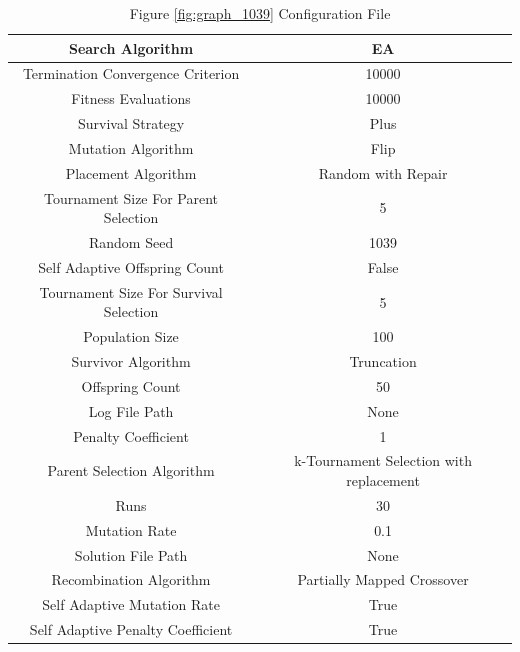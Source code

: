 \documentclass{standalone}
\begin{document}
\begin{table}[!htb]
	\centering
	\caption{Figure \ref{fig:graph_1039} Configuration File}
	\label{tab:graph_1039}
	\begin{tabular}{| c | c |}
		\hline
		Search Algorithm		& EA		 \\
		\hline
		Termination Convergence Criterion		& 10000		 \\
		\hline
		Fitness Evaluations		& 10000		 \\
		\hline
		Survival Strategy		& Plus		 \\
		\hline
		Mutation Algorithm		& Flip		 \\
		\hline
		Placement Algorithm		& Random with Repair		 \\
		\hline
		Tournament Size For Parent Selection		& 5		 \\
		\hline
		Random Seed		& 1039		 \\
		\hline
		Self Adaptive Offspring Count		& False		 \\
		\hline
		Tournament Size For Survival Selection		& 5		 \\
		\hline
		Population Size		& 100		 \\
		\hline
		Survivor Algorithm		& Truncation		 \\
		\hline
		Offspring Count		& 50		 \\
		\hline
		Log File Path		& None		 \\
		\hline
		Penalty Coefficient		& 1		 \\
		\hline
		Parent Selection Algorithm		& k-Tournament Selection with replacement		 \\
		\hline
		Runs		& 30		 \\
		\hline
		Mutation Rate		& 0.1		 \\
		\hline
		Solution File Path		& None		 \\
		\hline
		Recombination Algorithm		& Partially Mapped Crossover		 \\
		\hline
		Self Adaptive Mutation Rate		& True		 \\
		\hline
		Self Adaptive Penalty Coefficient		& True		 \\
		\hline
	\end{tabular}
\end{table}
\end{document}
